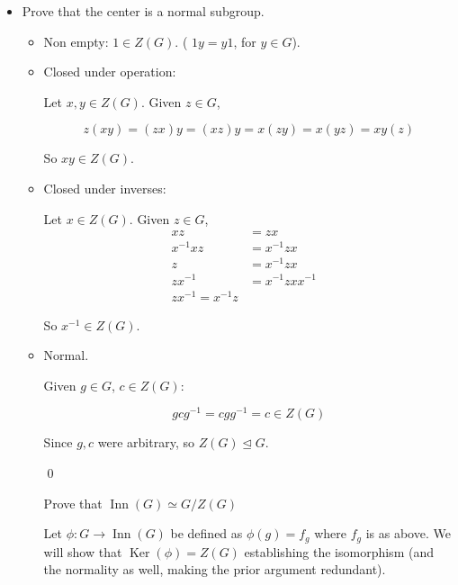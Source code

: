 \documentclass[11pt,oneside]{article}
\numberwithin{equation}{section}
\theoremstyle{definition}
\def\Inn{\operatorname{Inn}}
\def\Ker{\operatorname{Ker}}
\begin{document}
\begin{solution}
\begin{enumerate}[(a)]
\begin{itemize}
      $$
      f_a \circ f_{a^{-1}} (x)  = f_a(a ^ {-1} x a) = a a^ {-1} x a a^{-1} = x = 1 x 1 = f_{1}(x)
      $$
      
      So $f_a ^ {-1} = f_{a^{-1}} \in \Inn(G)$.
      
      \qed
      
    \item
      Prove that the center is a normal subgroup.
      \begin{itemize}
      \item
        Non empty: $1 \in Z(G)$. ( $1y = y1$, for $y \in G$).
      \item
        Closed under operation:
        
        Let $x, y \in Z(G)$.  Given $z \in G$,
        
        $$
        z (xy) = (zx) y = (xz) y = x (zy) = x (yz) = xy(z)
        $$
        
        So $xy \in Z(G)$.
      \item
        Closed under inverses:
        
        Let $x \in Z(G)$.  Given $z \in G$,
        \begin{align*}
          xz & = zx & \\
          x^{-1} x z & = x^{-1} z x & \\
          z & = x^{-1} z x & \\
          z x ^ {-1} & = x^{-1} z x x ^ { -1} & \\
          z x ^ {-1} = x^ { -1} z
        \end{align*}
        
        So $x^{-1} \in Z(G)$.
        
      \item
        Normal.
        
        Given $ g \in G$, $c \in Z(G)$:
        
        $$
        g c g ^ {-1} = c g g^{-1} = c \in Z(G)
        $$
        
        Since $g,c $ were arbitrary, so $Z(G) \trianglelefteq G$.
        
        \qed
        
        Prove that $ \Inn(G) \simeq G / Z(G)$
        
        Let $\phi : G \to \Inn(G)$ be defined as $\phi (g) = f_g$ where
        $f_g$ is as above.  We will show that $\Ker(\phi) = Z(G)$ establishing
        the isomorphism (and the normality as well, making the prior argument redundant).
        

\end{itemize}
\end{itemize}
\end{enumerate}
\end{solution}
\end{document}
